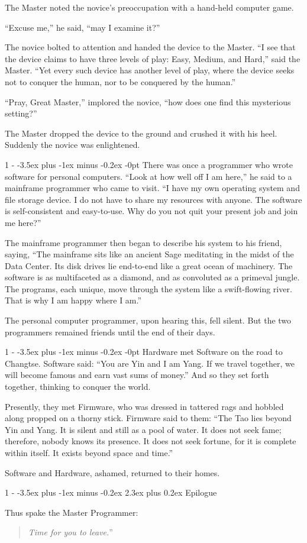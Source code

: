 \documentclass[12pt,letterpaper]{article}
\makeatletter
\newlength{\intomargin}\setlength{\intomargin}{25pt}
\renewcommand{\section}{%
\@startsection{section}%
{1}%
{-\intomargin}%
{-3.5ex plus -1ex minus -0.2ex}%
{2.3ex plus 0.2ex}%
{\normalfont\Large\bfseries}%
}
\renewcommand{\subsection}{%
\@startsection{subsection}%
{1}%
{-\intomargin}%
{-3.5ex plus -1ex minus -0.2ex}%
{-0pt}%
{\normalfont\large\bfseries}%
}
\newcommand{\book}[2]{\section{#1}\par\hspace{-\intomargin}Thus spake the Master Programmer:%
\begin{quotation}\noindent\llap{``}\textsl{#2}''\end{quotation}\medskip}
\newcommand{\sect}{\subsection{}}
\makeatother
\begin{document}
The Master noted the novice's preoccupation with a hand-held computer
game.

``Excuse me,'' he said, ``may I examine it?''

The novice bolted to attention and handed the device to the
Master. ``I see that the device claims to have three levels of play:
Easy, Medium, and Hard,'' said the Master. ``Yet every such device has
another level of play, where the device seeks not to conquer the
human, nor to be conquered by the human.''

``Pray, Great Master,'' implored the novice, ``how does one find this
mysterious setting?''

The Master dropped the device to the ground and crushed it with his
heel. Suddenly the novice was enlightened.

\sect
There was once a programmer who wrote software for personal
computers. ``Look at how well off I am here,'' he said to a mainframe
programmer who came to visit. ``I have my own operating system and
file storage device. I do not have to share my resources with
anyone. The software is self-consistent and easy-to-use. Why do you
not quit your present job and join me here?''

The mainframe programmer then began to describe his system to his
friend, saying, ``The mainframe sits like an ancient Sage meditating
in the midst of the Data Center. Its disk drives lie end-to-end like a
great ocean of machinery. The software is as multifaceted as a
diamond, and as convoluted as a primeval jungle. The programs, each
unique, move through the system like a swift-flowing river. That is
why I am happy where I am.''

The personal computer programmer, upon hearing this, fell silent. But
the two programmers remained friends until the end of their days.

\sect
Hardware met Software on the road to Changtse. Software said: ``You
are Yin and I am Yang. If we travel together, we will become famous
and earn vast sums of money.'' And so they set forth together,
thinking to conquer the world.

Presently, they met Firmware, who was dressed in tattered rags and
hobbled along propped on a thorny stick. Firmware said to them: ``The
Tao lies beyond Yin and Yang. It is silent and still as a pool of
water. It does not seek fame; therefore, nobody knows its presence. It
does not seek fortune, for it is complete within itself. It exists
beyond space and time.''

Software and Hardware, ashamed, returned to their homes.

\book{Epilogue}%
{Time for you to leave.}
\end{document}
